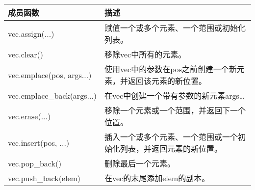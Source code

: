 \begin{longtable}[c]{|l|l|}
\hline
\textbf{成员函数}  & \textbf{描述}                                           \\ \hline
\endfirsthead
%
\endhead
%
vec.assign(...)            & 赋值一个或多个元素、一个范围或初始化列表。 \\ \hline
vec.clear()                & 移除vec中所有的元素。                                 \\ \hline
vec.emplace(pos, args...) & 使用vec中的参数在pos之前创建一个新元素，并返回该元素的新位置。          \\ \hline
vec.emplace\_back(args...) & 在vec中创建一个带有参数的新元素args…                     \\ \hline
vec.erase(...)             & 移除一个元素或一个范围，并返回下一个位置。  \\ \hline
vec.insert(pos, ...)      & 插入一个或多个元素、一个范围或一个初始化列表，并返回元素的新位置。 \\ \hline
vec.pop\_back()            & 删除最后一个元素。                                     \\ \hline
vec.push\_back(elem)       & 在vec的末尾添加elem的副本。                         \\ \hline
\end{longtable}
























